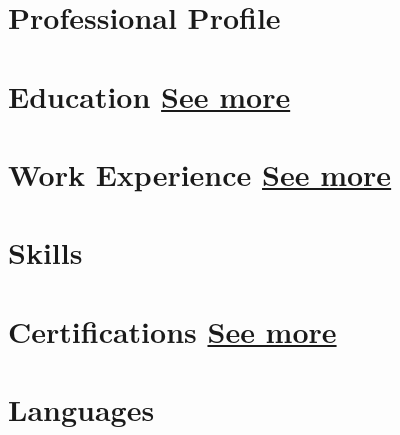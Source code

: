 \documentclass[letterpaper,12pt]{fed-res}
\begin{document}


\section{Professional Profile}


\section{Education \hfill \href{\urlEducationEn}{See more}}


\section{Work Experience \hfill \href{\urlWorkEn}{See more}}


\section{Skills}


\section{Certifications \hfill \href{\urlCertsEn}{See more}}


\section{Languages}

\end{document}
